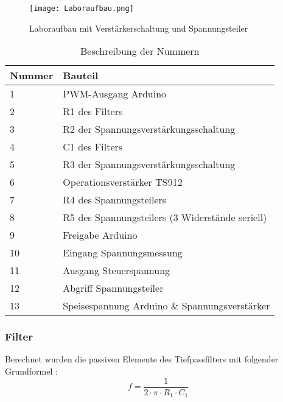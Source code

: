 \begin{figure}[ht!]  
	\centering
	\texttt{[image: Laboraufbau.png]}	
	\caption{Laboraufbau mit Verstärkerschaltung und Spannungsteiler}\label{fig:Laboraufbau}
\end{figure}
\begin{table}[ht!]
	\centering
	\begin{tabular}{|l|l|}
		\hline
		Nummer & Bauteil                                                             \\ \hline
		1      & PWM-Ausgang Arduino                                                 \\ \hline
		2      & R1 des Filters                                                      \\ \hline
		3      & R2 der Spannungsverstärkungsschaltung                               \\ \hline
		4      & C1 des Filters                                                      \\ \hline
		5      & R3 der Spannungsverstärkungsschaltung                               \\ \hline
		6      & Operationsverstärker TS912                                          \\ \hline
		7      & R4 des Spannungsteilers 											 \\ \hline
		8      & R5 des Spannungsteilers (3 Widerstände seriell)                     \\ \hline
		9      & Freigabe Arduino                                                    \\ \hline
		10     & Eingang Spannungsmessung                                            \\ \hline
		11     & Ausgang Steuerspannung                                              \\ \hline
		12     & Abgriff Spannungsteiler                                             \\ \hline
		13     & Speisespannung Arduino \& Spannungsverstärker                       \\ \hline
	\end{tabular}
	\caption{Beschreibung der Nummern}
	\label{tab:Laboraufbau}
\end{table}

\newpage
\subsubsection*{Filter}
Berechnet wurden die passiven Elemente des Tiefpassfilters mit folgender Grundformel \cite{Tiefpass}:
\begin{equation}
f = \frac{1}{2 \cdot \pi \cdot R_1 \cdot C_1}
\end{equation}


